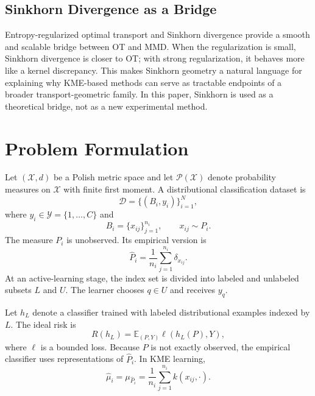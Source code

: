 \documentclass[10pt,journal]{IEEEtran}
\newcommand{\E}{\mathbb{E}}
\newcommand{\Pcal}{\mathcal{P}}
\newcommand{\Xcal}{\mathcal{X}}
\newcommand{\Ycal}{\mathcal{Y}}
\newcommand{\Dcal}{\mathcal{D}}
\newcommand{\wh}{\widehat}
\begin{document}
\subsection{Sinkhorn Divergence as a Bridge}

Entropy-regularized optimal transport and Sinkhorn divergence provide a smooth and scalable bridge between OT and MMD. When the regularization is small, Sinkhorn divergence is closer to OT; with strong regularization, it behaves more like a kernel discrepancy. This makes Sinkhorn geometry a natural language for explaining why KME-based methods can serve as tractable endpoints of a broader transport-geometric family. In this paper, Sinkhorn is used as a theoretical bridge, not as a new experimental method.

\section{Problem Formulation}
\label{sec:problem}

Let $(\Xcal,d)$ be a Polish metric space and let $\Pcal(\Xcal)$ denote probability measures on $\Xcal$ with finite first moment. A distributional classification dataset is
\begin{equation}
    \Dcal = \{(B_i,y_i)\}_{i=1}^{N},
\end{equation}
where $y_i\in\Ycal=\{1,\ldots,C\}$ and
\begin{equation}
    B_i=\{x_{ij}\}_{j=1}^{n_i},\qquad x_{ij}\sim P_i.
\end{equation}
The measure $P_i$ is unobserved. Its empirical version is
\begin{equation}
    \wh P_i = \frac{1}{n_i}\sum_{j=1}^{n_i}\delta_{x_{ij}}.
\end{equation}
At an active-learning stage, the index set is divided into labeled and unlabeled subsets $L$ and $U$. The learner chooses $q\in U$ and receives $y_q$.

Let $h_L$ denote a classifier trained with labeled distributional examples indexed by $L$. The ideal risk is
\begin{equation}
    R(h_L)=\E_{(P,Y)}\ell(h_L(P),Y),
\end{equation}
where $\ell$ is a bounded loss. Because $P$ is not exactly observed, the empirical classifier uses representations of $\wh P_i$. In KME learning,
\begin{equation}
    \wh\mu_i=\mu_{\wh P_i}=\frac{1}{n_i}\sum_{j=1}^{n_i} k(x_{ij},\cdot).
\end{equation}
\end{document}
